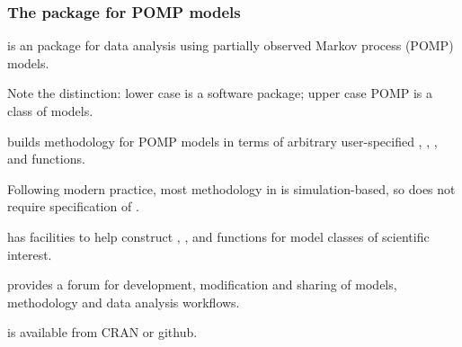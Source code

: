 \documentclass{beamer}\usepackage[]{graphicx}\usepackage[]{color}
\begin{document}
\begin{frame}[fragile] 

\frametitle{The   {\R}  package for POMP models}

\bi

\item {} is an  {\R}  package for data analysis using partially observed Markov process (POMP) models.

\item Note the distinction: lower case  is a software package; 
upper case POMP is a class of models.

\item {} builds methodology for POMP models in terms of arbitrary user-specified , , , and  functions.
 
\item Following modern practice, most methodology in  is simulation-based, so does not require specification of .

\item {} has facilities to help construct , , and  functions for model classes of scientific interest.

\item {} provides a forum for development, modification and sharing of models, methodology and data analysis workflows.

\item {} is available from CRAN or github.

\ei

\end{frame}    
\end{document}

